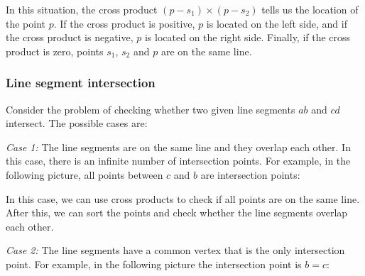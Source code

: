 In this situation,
the cross product $(p-s_1) \times (p-s_2)$
tells us the location of the point $p$.
If the cross product is positive,
$p$ is located on the left side,
and if the cross product is negative,
$p$ is located on the right side.
Finally, if the cross product is zero,
points $s_1$, $s_2$ and $p$ are on the same line.

\subsubsection{Line segment intersection}


Consider the problem of checking
whether two given line segments
$ab$ and $cd$ intersect. The possible cases are:

\textit{Case 1:}
The line segments are on the same line
and they overlap each other.
In this case, there is an infinite number of
intersection points.
For example, in the following picture,
all points between $c$ and $b$ are
intersection points:
\begin{center}
\end{center}

In this case, we can use cross products to
check if all points are on the same line.
After this, we can sort the points and check
whether the line segments overlap each other.

\textit{Case 2:}
The line segments have a common vertex
that is the only intersection point.
For example, in the following picture the
intersection point is $b=c$:

\begin{center}
\end{center}

